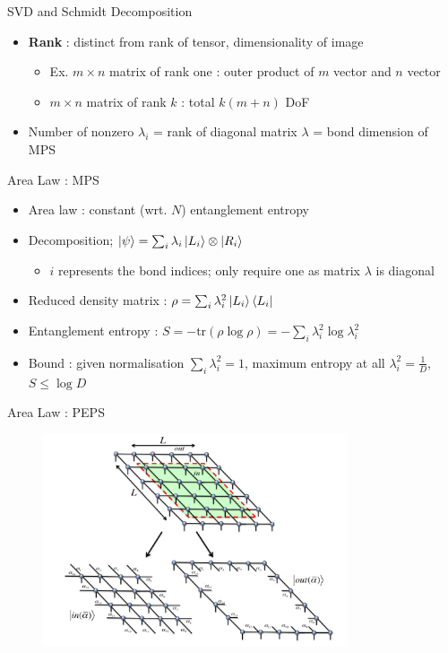 \documentclass{beamer}
\begin{document}
\begin{frame}{SVD and Schmidt Decomposition}
			\begin{itemize}
		\item \textbf{Rank} : distinct from rank of tensor, dimensionality of image
					\begin{itemize}
			\item Ex. ${ m \times n }$ matrix of rank one : outer product of ${ m }$ vector and ${ n }$ vector
			\item ${ m \times  n }$ matrix of rank ${ k }$ : total ${ k(m+n) }$ DoF
				\end{itemize}
			\item Number of nonzero ${ \lambda _{i} }$ = rank of diagonal matrix ${ \lambda  }$ = bond dimension of MPS
		\end{itemize}

\end{frame}


\begin{frame}{Area Law : MPS}
	\begin{itemize}
	\item Area law : constant (wrt. ${ N }$) entanglement entropy
	\item Decomposition; ${ \ket{\psi }=\sum_{i}^{} \lambda _{i}\ket{L_{i}}\otimes \ket{R_{i}} }$
		\begin{itemize}
		\item ${ i }$ represents the bond indices; only require one as matrix ${ \lambda  }$ is diagonal
		\end{itemize}
	\item Reduced density matrix : ${ \rho =\sum_{i}^{} \lambda _{i}^{2}\ket{L_{i}}\bra{L_{i}} }$
\item Entanglement entropy : ${ S=-\text{tr}(\rho \log{\rho })=-\sum_{i}^{} \lambda _{i}^{2}\log{\lambda _{i}^{2}} }$
\item Bound : given normalisation ${ \sum_{i}^{} \lambda _{i}^{2}=1 }$, maximum entropy at all ${ \lambda _{i}^{2} =\frac{1}{D}}$, ${ S \leq \log{D} }$
		\end{itemize}
\end{frame}

\begin{frame}{Area Law : PEPS}
	\begin{figure}[h]
	\includegraphics[width=0.8\textwidth]{peps}
	\centering
	\end{figure}
\end{frame}
\end{document}
